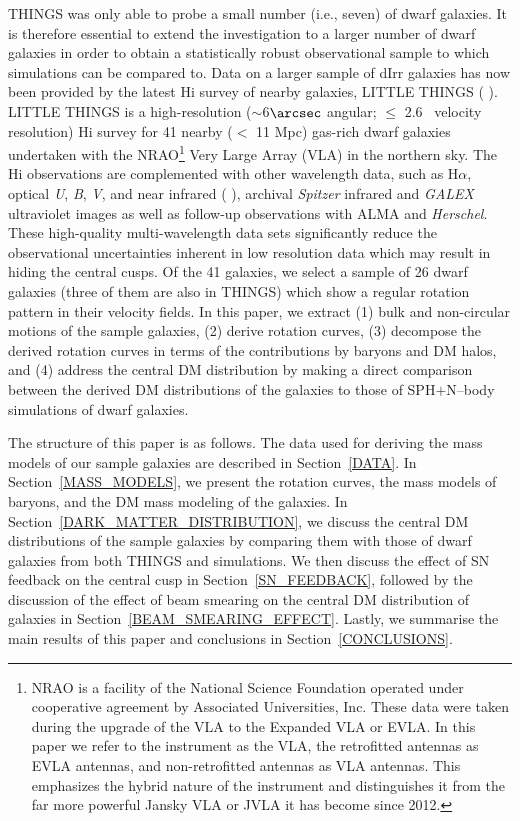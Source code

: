 \documentclass[natbib209]{emulateapj}
\begin{document}
THINGS was only able to probe a small number (i.e., seven) of dwarf galaxies. It
is therefore essential to extend the investigation to a larger number of dwarf
galaxies in order to obtain a statistically robust observational sample to which
simulations can be compared to. 
Data on a larger sample of dIrr galaxies has now been provided 
by the latest H{\sc i} survey of nearby galaxies, LITTLE THINGS (\citeauthor{Hunter_2012}
\citeyear{Hunter_2012}). 
LITTLE THINGS is a high-resolution ($\sim$6$\arcsec$
angular; $\leq$ 2.6 \kms\ velocity resolution) H{\sc i} survey for 41 nearby
($<$ 11 Mpc) gas-rich dwarf galaxies undertaken with the NRAO\footnote{NRAO is a
facility of the National Science Foundation operated under cooperative agreement
by Associated Universities, Inc. These data were taken during the upgrade of the
VLA to the Expanded VLA or EVLA. In this paper we refer to the instrument as the
VLA, the retrofitted antennas as EVLA antennas, and non-retrofitted antennas as
VLA antennas. This emphasizes the hybrid nature of the instrument and
distinguishes it from the far more powerful Jansky VLA or JVLA it has become
since 2012.} Very Large Array (VLA)
in the northern sky. The H{\sc i} observations are complemented with other wavelength data, such as H$\alpha$,
optical {\it U}, {\it B}, {\it V}, and near infrared (\citeauthor{Hunter_2006}
\citeyear{Hunter_2006}), archival {\it Spitzer} infrared and {\it GALEX}
ultraviolet images as well as follow-up observations with ALMA and {\it
Herschel}. These high-quality multi-wavelength
data sets significantly reduce the observational uncertainties
inherent in low resolution data which may result in hiding the central cusps. Of the 41
galaxies, we select a sample of 26 dwarf galaxies (three of them are also in
THINGS) which show a regular rotation pattern in their velocity fields. In this
paper, we extract (1) bulk and non-circular motions of
the sample galaxies, (2) derive rotation curves, (3) decompose the derived rotation
curves in terms of the contributions by baryons and DM halos, and (4) address
the central DM distribution by making a direct comparison between the derived DM
distributions of the galaxies to those of SPH$+$N--body simulations of dwarf
galaxies.

The structure of this paper is as follows. The data used for deriving the mass
models of our sample galaxies are described in Section~\ref{DATA}. In
Section~\ref{MASS_MODELS}, we present the rotation curves, the mass models of
baryons, and the DM mass modeling of the galaxies. 
In Section~\ref{DARK_MATTER_DISTRIBUTION}, we discuss the central DM 
distributions of the sample galaxies by comparing them with those of dwarf galaxies
from both THINGS and simulations. We then discuss the effect of SN feedback
on the central cusp in Section~\ref{SN_FEEDBACK}, followed by the discussion of
the effect of beam smearing on the central DM distribution of galaxies
in Section~\ref{BEAM_SMEARING_EFFECT}. Lastly, we summarise the main results of this
paper and conclusions in Section~\ref{CONCLUSIONS}. 
\end{document}
